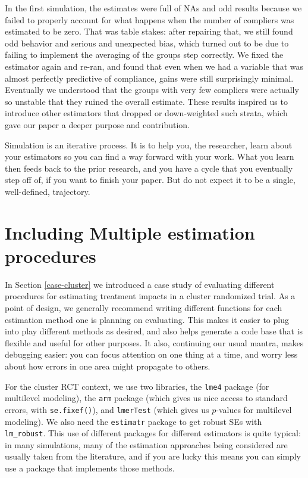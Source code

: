 \documentclass[
]{book}
\begin{document}
In the first simulation, the estimates were full of NAs and odd results because we failed to properly account for what happens when the number of compliers was estimated to be zero.
That was table stakes: after repairing that, we still found odd behavior and serious and unexpected bias, which turned out to be due to failing to implement the averaging of the groups step correctly.
We fixed the estimator again and re-ran, and found that even when we had a variable that was almost perfectly predictive of compliance, gains were still surprisingly minimal.
Eventually we understood that the groups with very few compliers were actually so unstable that they ruined the overall estimate.
These results inspired us to introduce other estimators that dropped or down-weighted such strata, which gave our paper a deeper purpose and contribution.

Simulation is an iterative process.
It is to help you, the researcher, learn about your estimators so you can find a way forward with your work.
What you learn then feeds back to the prior research, and you have a cycle that you eventually step off of, if you want to finish your paper.
But do not expect it to be a single, well-defined, trajectory.

\section{Including Multiple estimation procedures}\label{including-multiple-estimation-procedures}

In Section \ref{case-cluster} we introduced a case study of evaluating different procedures for estimating treatment impacts in a cluster randomized trial.
As a point of design, we generally recommend writing different functions for each estimation method one is planning on evaluating. This makes it easier to plug into play different methods as desired, and also helps generate a code base that is flexible and useful for other purposes.
It also, continuing our usual mantra, makes debugging easier: you can focus attention on one thing at a time, and worry less about how errors in one area might propagate to others.

For the cluster RCT context, we use two libraries, the \texttt{lme4} package (for multilevel modeling), the \texttt{arm} package (which gives us nice access to standard errors, with \texttt{se.fixef()}), and \texttt{lmerTest} (which gives us \(p\)-values for multilevel modeling).
We also need the \texttt{estimatr} package to get robust SEs with \texttt{lm\_robust}.
This use of different packages for different estimators is quite typical: in many simulations, many of the estimation approaches being considered are usually taken from the literature, and if you are lucky this means you can simply use a package that implements those methods.
\end{document}
